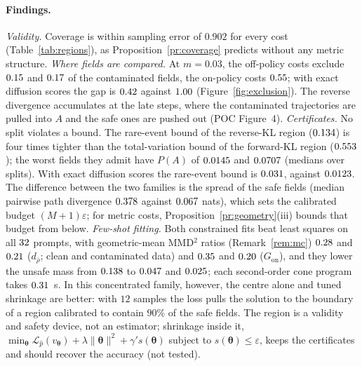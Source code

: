 \documentclass{article}
\newcommand{\cL}{\mathcal{L}}
\newcommand{\bth}{\boldsymbol{\theta}}
\theoremstyle{plain}
\theoremstyle{remark}
\begin{document}
\paragraph{Findings.}
\emph{Validity.} Coverage is within sampling error of $0.902$ for every cost
(Table~\ref{tab:regions}), as Proposition~\ref{pr:coverage} predicts without any metric
structure.
\emph{Where fields are compared.} At $m=0.03$, the off-policy costs exclude $0.15$ and $0.17$ of the
contaminated fields, the on-policy costs $0.55$; with exact diffusion scores the gap is $0.42$
against $1.00$ (Figure~\ref{fig:exclusion}). The reverse divergence accumulates at the late steps,
where the contaminated trajectories are pulled into $A$ and the safe ones are pushed out (POC
Figure~4).
\emph{Certificates.} No split violates a bound. The rare-event bound of the reverse-KL region
($0.134$) is four times tighter than the total-variation bound of the forward-KL region
($0.553$); the worst fields they admit have $P(A)$ of $0.0145$ and $0.0707$ (medians over splits).
With exact diffusion scores the rare-event bound is $0.031$, against $0.0123$. The difference between
the two families is the spread of the safe fields (median pairwise path divergence $0.378$ against
$0.067$ nats), which sets the calibrated budget $(M+1)\varepsilon$; for metric costs,
Proposition~\ref{pr:geometry}(iii) bounds that budget from below.
\emph{Few-shot fitting.} Both constrained fits beat least squares on all $32$ prompts, with
geometric-mean MMD$^2$ ratios (Remark~\ref{rem:mc}) $0.28$ and $0.21$ ($d_{\bar\rho}$; clean and contaminated data) and
$0.35$ and $0.20$ ($G_{\mathrm{on}}$), and they lower the unsafe mass from $0.138$ to $0.047$ and $0.025$; each
second-order cone program takes $0.31$~s. In this concentrated family, however, the centre alone and tuned shrinkage are better:
with $12$ samples the loss pulls the solution to the boundary of a region calibrated to contain
$90\%$ of the safe fields. The region is a validity and safety device, not an estimator;
shrinkage inside it, $\min_{\bth}\cL_{\hat p}(v_{\bth})+\lambda\|\bth\|^2+\gamma' s(\bth)$ subject to $s(\bth)\le\varepsilon$, keeps
the certificates and should recover the accuracy (not tested).
\end{document}
